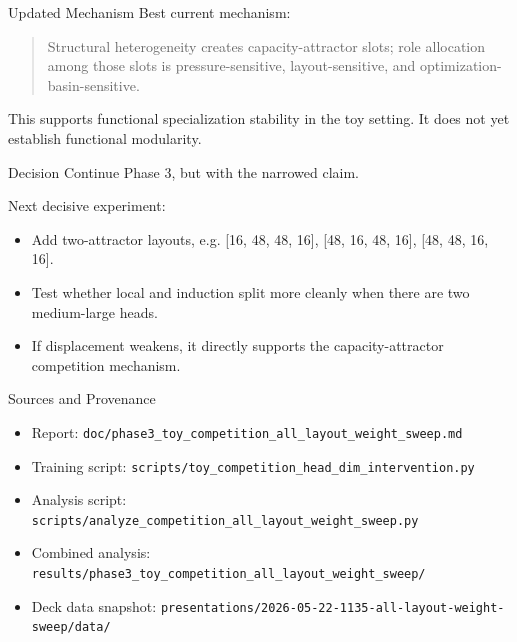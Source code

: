 \documentclass[aspectratio=169]{beamer}
\begin{document}
\begin{frame}{Updated Mechanism}
  Best current mechanism:

  \vspace{0.8em}
  \begin{quote}
    Structural heterogeneity creates capacity-attractor slots; role allocation
    among those slots is pressure-sensitive, layout-sensitive, and
    optimization-basin-sensitive.
  \end{quote}

  \vspace{0.8em}
  This supports functional specialization stability in the toy setting. It does
  not yet establish functional modularity.
\end{frame}

\begin{frame}{Decision}
  Continue Phase 3, but with the narrowed claim.

  \vspace{0.8em}
  Next decisive experiment:
  \begin{itemize}
    \item Add two-attractor layouts, e.g. [16, 48, 48, 16], [48, 16, 48, 16], [48, 48, 16, 16].
    \item Test whether local and induction split more cleanly when there are two medium-large heads.
    \item If displacement weakens, it directly supports the capacity-attractor competition mechanism.
  \end{itemize}
\end{frame}

\begin{frame}{Sources and Provenance}
  \scriptsize
  \begin{itemize}
    \item Report: \texttt{doc/phase3\_toy\_competition\_all\_layout\_weight\_sweep.md}
    \item Training script: \texttt{scripts/toy\_competition\_head\_dim\_intervention.py}
    \item Analysis script: \texttt{scripts/analyze\_competition\_all\_layout\_weight\_sweep.py}
    \item Combined analysis: \texttt{results/phase3\_toy\_competition\_all\_layout\_weight\_sweep/}
    \item Deck data snapshot: \texttt{presentations/2026-05-22-1135-all-layout-weight-sweep/data/}
  \end{itemize}
\end{frame}
\end{document}
